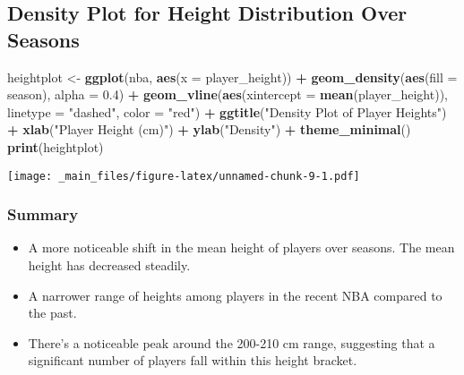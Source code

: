 \documentclass[
]{book}
\newenvironment{Shaded}{\begin{snugshade}}{\end{snugshade}}
\newcommand{\AttributeTok}[1]{\textcolor[rgb]{0.13,0.29,0.53}{#1}}
\newcommand{\FloatTok}[1]{\textcolor[rgb]{0.00,0.00,0.81}{#1}}
\newcommand{\FunctionTok}[1]{\textcolor[rgb]{0.13,0.29,0.53}{\textbf{#1}}}
\newcommand{\NormalTok}[1]{#1}
\newcommand{\OtherTok}[1]{\textcolor[rgb]{0.56,0.35,0.01}{#1}}
\newcommand{\SpecialCharTok}[1]{\textcolor[rgb]{0.81,0.36,0.00}{\textbf{#1}}}
\newcommand{\StringTok}[1]{\textcolor[rgb]{0.31,0.60,0.02}{#1}}
\providecommand{\tightlist}{%
  \setlength{\itemsep}{0pt}\setlength{\parskip}{0pt}}
\theoremstyle{definition}
\theoremstyle{definition}
\theoremstyle{definition}
\theoremstyle{definition}
\theoremstyle{remark}
\begin{document}
\hypertarget{density-plot-for-height-distribution-over-seasons}{%
\subsection{Density Plot for Height Distribution Over Seasons}\label{density-plot-for-height-distribution-over-seasons}}

\begin{Shaded}
\begin{Highlighting}[]
\NormalTok{heightplot }\OtherTok{\textless{}{-}} \FunctionTok{ggplot}\NormalTok{(nba, }\FunctionTok{aes}\NormalTok{(}\AttributeTok{x =}\NormalTok{ player\_height)) }\SpecialCharTok{+}
  \FunctionTok{geom\_density}\NormalTok{(}\FunctionTok{aes}\NormalTok{(}\AttributeTok{fill =}\NormalTok{ season), }\AttributeTok{alpha =} \FloatTok{0.4}\NormalTok{) }\SpecialCharTok{+}
  \FunctionTok{geom\_vline}\NormalTok{(}\FunctionTok{aes}\NormalTok{(}\AttributeTok{xintercept =} \FunctionTok{mean}\NormalTok{(player\_height)), }\AttributeTok{linetype =} \StringTok{"dashed"}\NormalTok{, }\AttributeTok{color =} \StringTok{"red"}\NormalTok{) }\SpecialCharTok{+}
  \FunctionTok{ggtitle}\NormalTok{(}\StringTok{"Density Plot of Player Heights"}\NormalTok{) }\SpecialCharTok{+}
  \FunctionTok{xlab}\NormalTok{(}\StringTok{"Player Height (cm)"}\NormalTok{) }\SpecialCharTok{+}
  \FunctionTok{ylab}\NormalTok{(}\StringTok{"Density"}\NormalTok{) }\SpecialCharTok{+}
  \FunctionTok{theme\_minimal}\NormalTok{()}
\FunctionTok{print}\NormalTok{(heightplot)}
\end{Highlighting}
\end{Shaded}

\texttt{[image: \_main\_files/figure-latex/unnamed-chunk-9-1.pdf]}

\hypertarget{summary}{%
\subsubsection{Summary}\label{summary}}

\begin{itemize}
\tightlist
\item
  A more noticeable shift in the mean height of players over seasons. The mean height has decreased steadily.
\item
  A narrower range of heights among players in the recent NBA compared to the past.
\item
  There's a noticeable peak around the 200-210 cm range, suggesting that a significant number of players fall within this height bracket.
\end{itemize}
\end{document}

